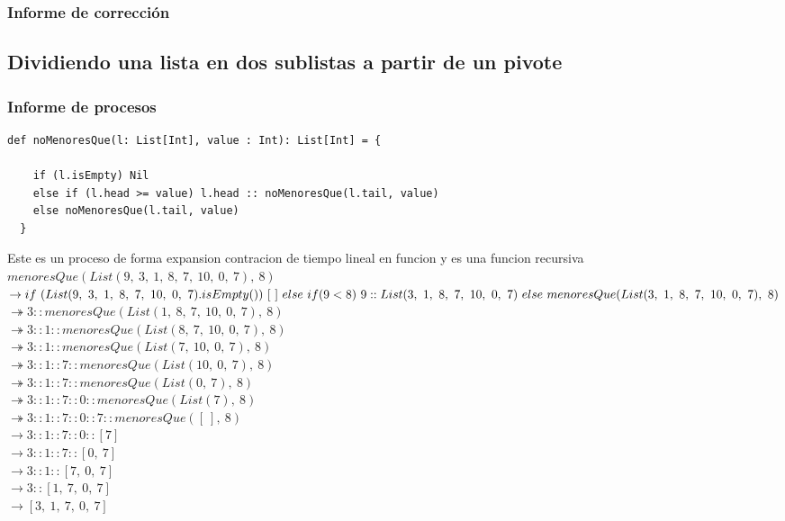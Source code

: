 \documentclass[12pt, a4paper]{article}
\begin{document}
\subsubsection{Informe de corrección}
\subsection{Dividiendo una lista en dos sublistas a partir de un pivote}
\subsubsection{Informe de procesos}
\begin{lstlisting}[style=scalaStyle, caption=Calcula una lista construida con los valores menores de un valor pivote proporcionado]
   def noMenoresQue(l: List[Int], value : Int): List[Int] = {

    if (l.isEmpty) Nil
    else if (l.head >= value) l.head :: noMenoresQue(l.tail, value)
    else noMenoresQue(l.tail, value)
  }
\end{lstlisting}
Este es un proceso de forma expansion contracion de tiempo lineal en funcion  y es una funcion recursiva
$menoresQue(List(9, ~3, ~1, ~8, ~7, ~10, ~0, ~7), ~8)$\\
$\rightarrow if ~(List(9, ~3, ~1, ~8, ~7, ~10, ~0, ~7).isEmpty())~[~] \\
\ else~ if(9 < 8) ~9::List(3, ~1, ~8, ~7, ~10, ~0, ~7) \\
  ~else ~menoresQue(List(3, ~1, ~8, ~7, ~10, ~0, ~7), ~8)$ \\
$\twoheadrightarrow 3::menoresQue(List(1, ~8, ~7, ~10, ~0, ~7), ~8)$\\
$\twoheadrightarrow 3::1::menoresQue(List( 8, ~7, ~10, ~0, ~7), ~8)$ \\
$\twoheadrightarrow 3::1::menoresQue(List( 7, ~10, ~0, ~7), ~8)$ \\
$\twoheadrightarrow 3::1::7::menoresQue(List( 10, ~0, ~7), ~8)$ \\
$\twoheadrightarrow 3::1::7::menoresQue(List( 0, ~7), ~8)$ \\
$\twoheadrightarrow 3::1::7::0::menoresQue(List( 7 ), ~8)$ \\
$\twoheadrightarrow 3::1::7::0::7::menoresQue([~], ~8)$ \\
$\rightarrow 3::1::7::0::[7]$ \\
$\rightarrow 3::1::7::[0, ~7]$ \\
$\rightarrow 3::1::[7, ~0, ~7]$ \\
$\rightarrow 3::[1, ~7, ~0, ~7]$ \\
$\rightarrow [3, ~1, ~7, ~0,~7]$ \\
\end{document}
